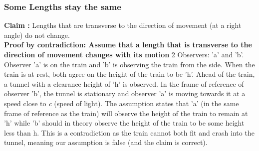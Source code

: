 \documentclass[10pt]{report}
\begin{document}
\subsubsection{Some Lengths stay the same}
\par{\textbf{Claim :} Lengths that are transverse to the direction of movement (at a right angle) do not change.\\\textbf{Proof by contradiction: Assume that a length that is transverse to the direction of movement changes with its motion} 2 Observers: 'a' and 'b'. Observer 'a' is on the train and 'b' is observing the train from the side. When the train is at rest, both agree on the height of the train to be 'h'. Ahead of the train, a tunnel with a clearance height of 'h' is observed. In the frame of reference of observer 'b', the tunnel is stationary and observer 'a' is moving towards it at a speed close to \textit{c} (speed of light). The assumption states that 'a' (in the same frame of reference as the train) will observe the height of the train to remain at 'h' while 'b' should in theory observe the height of the train to be some height less than h. This is a contradiction as the train cannot both fit and crash into the tunnel, meaning our assumption is false (and the claim is correct).
}
\end{document}

